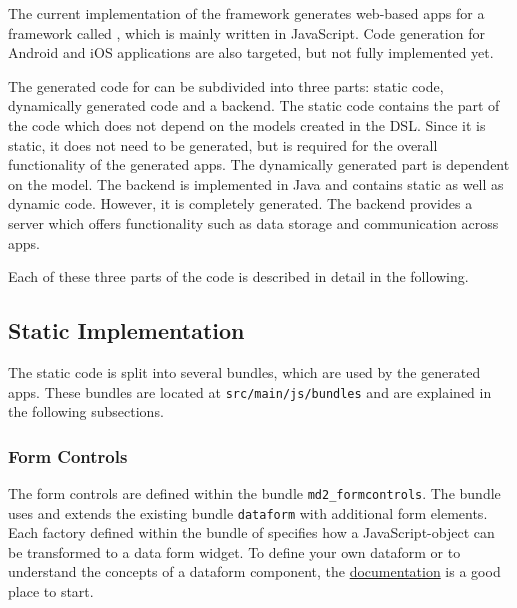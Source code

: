 
\lstset{language=Simple}

The current implementation of the \MD framework generates web-based apps for a framework called 
\mapapps, which is mainly written in JavaScript. Code generation for Android and iOS applications are also targeted, but not fully implemented yet.

The generated code for \mapapps can be subdivided into three parts: static \mapapps code, dynamically generated \mapapps code and a backend. The static \mapapps code contains the part of the code which does not depend on the models created in the \MD DSL. Since it is static, it does not need to be generated, but is required for the overall functionality of the generated apps. The dynamically generated part is dependent on the model. The backend is implemented in Java and contains static as well as dynamic code. However, it is completely generated. The backend provides a server which offers functionality such as data storage and communication across apps.

Each of these three parts of the code is described in detail in the following.


\subsection{Static \mapapps Implementation}

The static \mapapps code is split into several bundles, which are used by the generated \mapapps apps. These bundles are located at \lstinline!src/main/js/bundles! and are explained in the following subsections.

\subsubsection{Form Controls}

The form controls are defined within the bundle \lstinline!md2_formcontrols!. The bundle uses and extends the existing \mapapps bundle \lstinline|dataform| with additional form elements. Each factory defined within the bundle of \MD specifies how a JavaScript-object can be transformed to a data form widget. To define your own dataform or to understand the concepts of a dataform component, the \href{http://developernetwork.conterra.de/documentation/31/developers/dataform}{\mapapps documentation} is a good place to start.

